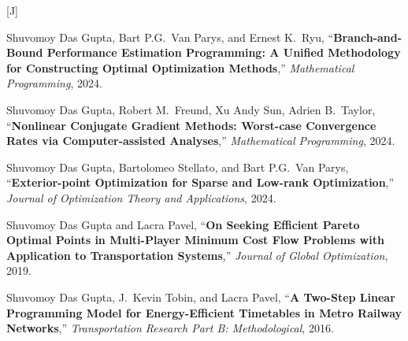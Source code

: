 \documentclass[margin,line,pifont]{./FontsAndCls/custom_res}
\newcounter{publication}
\newlength{\publicationitemsep}
\newenvironment{publicationlist}[1]{%
  \setlength{\publicationitemsep}{\parskip}%
  \begin{list}{[#1\arabic{publication}]}{%
    \usecounter{publication}%
    \setlength{\labelwidth}{2.5em}%
    \setlength{\labelsep}{0.5em}%
    \setlength{\leftmargin}{\dimexpr\labelwidth+\labelsep\relax}%
    \setlength{\rightmargin}{0pt}%
    \setlength{\itemindent}{0pt}%
    \setlength{\listparindent}{0pt}%
    \setlength{\itemsep}{\publicationitemsep}%
    \setlength{\parsep}{0pt}%
    \setlength{\topsep}{0pt}%
    \setlength{\partopsep}{0pt}%
    \renewcommand{\makelabel}[1]{\hfil\normalfont ##1}%
  }%
}{\end{list}}
\begin{document}
\begin{resume}
\begin{publicationlist}{J}
\item \begin{minipage}[t]{\linewidth}
Shuvomoy Das Gupta, Bart P.G.\ Van Parys, and Ernest K.\ Ryu, ``\textbf{Branch-and-Bound Performance Estimation Programming: A Unified Methodology for Constructing Optimal Optimization Methods},'' \textit{Mathematical Programming}, 2024. \\
\end{minipage}

\item \begin{minipage}[t]{\linewidth}
Shuvomoy Das Gupta, Robert M.\ Freund, Xu Andy Sun, Adrien B.\ Taylor, ``\textbf{Nonlinear Conjugate Gradient Methods: Worst-case Convergence Rates via Computer-assisted Analyses},'' \textit{Mathematical Programming}, 2024. \\
\end{minipage}

\item \begin{minipage}[t]{\linewidth}
Shuvomoy Das Gupta, Bartolomeo Stellato, and Bart P.G.\ Van Parys, ``\textbf{Exterior-point Optimization for Sparse and Low-rank Optimization},'' \textit{Journal of Optimization Theory and Applications}, 2024. \\
\end{minipage}

\item \begin{minipage}[t]{\linewidth}
Shuvomoy Das Gupta and Lacra Pavel, ``\textbf{On Seeking Efficient Pareto Optimal Points in Multi-Player Minimum Cost Flow Problems with Application to Transportation Systems},'' \textit{Journal of Global Optimization}, 2019. \\
\end{minipage}

\item \begin{minipage}[t]{\linewidth}
Shuvomoy Das Gupta, J.\ Kevin Tobin, and Lacra Pavel, ``\textbf{A Two-Step Linear Programming Model for Energy-Efficient Timetables in Metro Railway Networks},'' \textit{Transportation Research Part B: Methodological}, 2016. \\
\end{minipage}
\end{publicationlist}


\end{resume}
\end{document}
